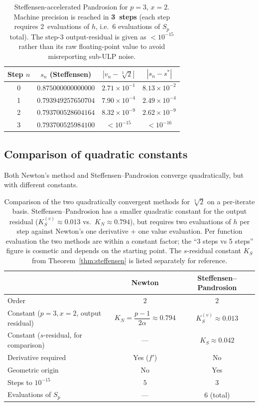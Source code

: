 \documentclass[11pt,a4paper]{article}
\theoremstyle{definition}
\newcommand{\cbrt}[1]{\sqrt[3]{#1}}
\begin{document}
\begin{table}[H]
\centering
\begin{tabular}{cccc}
\toprule
Step $n$ & $s_n$ (Steffensen) & $|v_n - \cbrt{2}|$ & $|s_n - s^*|$ \\
\midrule
0 & $0.875000000000000$ & $2.71 \times 10^{-1}$ & $8.13 \times 10^{-2}$ \\
1 & $0.793949257650704$ & $7.90 \times 10^{-4}$ & $2.49 \times 10^{-4}$ \\
2 & $0.793700528604164$ & $8.32 \times 10^{-9}$ & $2.62 \times 10^{-9}$ \\
3 & $0.793700525984100$ & $< 10^{-15}$ & $< 10^{-16}$ \\
\bottomrule
\end{tabular}
\caption{Steffensen-accelerated Pandrosion for $p=3$, $x=2$. Machine precision is reached in \textbf{3~steps} (each step requires 2~evaluations of $h$, i.e.\ 6 evaluations of $S_p$ total). The step-$3$ output-residual is given as $< 10^{-15}$ rather than its raw floating-point value to avoid misreporting sub-ULP noise.}
\label{tab:steff-numerical}
\end{table}

\subsection{Comparison of quadratic constants}

Both Newton's method and Steffensen--Pandrosion converge quadratically, but with different constants.

\begin{table}[H]
\centering
\renewcommand{\arraystretch}{1.3}
\begin{tabular}{lcc}
\toprule
& \textbf{Newton} & \textbf{Steffensen--Pandrosion} \\
\midrule
Order & $2$ & $2$ \\
Constant ($p\!=\!3, x\!=\!2$, output residual) & $K_N = \dfrac{p-1}{2\alpha} \approx 0.794$ & $K_S^{(v)} \approx 0.013$ \\
Constant ($s$-residual, for comparison) & --- & $K_S \approx 0.042$ \\
Derivative required & Yes ($f'$) & No \\
Geometric origin & No & Yes \\
Steps to $10^{-15}$ & $5$ & $3$ \\
Evaluations of $S_p$ & --- & $6$ (total) \\
\bottomrule
\end{tabular}
\caption{Comparison of the two quadratically convergent methods for $\cbrt{2}$ on a per-iterate basis. Steffensen--Pandrosion has a smaller quadratic constant for the output residual ($K_S^{(v)} \approx 0.013$ vs.\ $K_N \approx 0.794$), but requires two evaluations of $h$ per step against Newton's one derivative + one value evaluation. Per function evaluation the two methods are within a constant factor; the ``3 steps vs 5 steps'' figure is cosmetic and depends on the starting point. The $s$-residual constant $K_S$ from Theorem~\ref{thm:steffensen} is listed separately for reference.}
\label{tab:ks-comparison}
\end{table}
\end{document}
